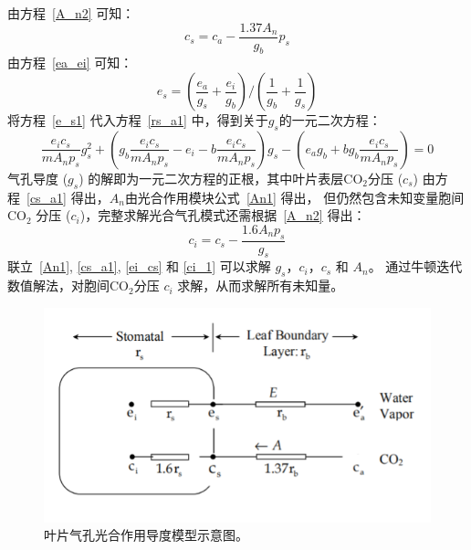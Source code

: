 由方程~\eqref{A_n2} 可知：
\begin{equation}\label{cs_a1}
c_{s}=c_{a}-\frac{1.37 A_{n}}{g_{b}} p_{s}
\end{equation}
由方程~\eqref{ea_ei} 可知：
\begin{equation}\label{e_s1}
e_{s}=\left(\frac{e_{a}}{g_{s}}+\frac{e_{i}}{g_{b}}\right) /\left(\frac{1}{g_{b}}+\frac{1}{g_{s}}\right)
\end{equation}
将方程~\eqref{e_s1} 代入方程~\ref{rs_a1} 中，得到关于$g_s$的一元二次方程：
\begin{equation}\label{ei_cs}
\frac{e_{i} c_{s}}{m A_{n} p_{s}} g_{s}^{2}+\left(g_{b} \frac{e_{i} c_{s}}{m A_{n} p_{s}}-e_{i}-b \frac{e_{i} c_{s}}{m A_{n} p_{s}}\right) g_{s}
-\left(e_{a} g_{b}+b g_{b} \frac{e_{i} c_{s}}{m A_{n} p_{s}}\right)=0
\end{equation}
气孔导度 ($g_s$) 的解即为一元二次方程的正根，其中叶片表层$\mathrm{CO_2}$分压 ($c_s$) 由方程~\eqref{cs_a1} 得出，$A_n$由光合作用模块公式~\eqref{An1} 得出，
但仍然包含未知变量胞间 $\mathrm{CO_2}$ 分压 ($c_i$)，完整求解光合气孔模式还需根据~\eqref{A_n2} 得出：
\begin{equation}\label{ci_1}
c_{i}=c_{s}-\frac{1.6 A_{n} p_{s}}{g_{s}}
\end{equation}
联立~\eqref{An1}, \eqref{cs_a1}, \eqref{ei_cs} 和 \eqref{ci_1} 可以求解 $g_s$，$c_i$，$c_s$ 和 $A_n$。
通过牛顿迭代数值解法，对胞间$\mathrm{CO_2}$分压 $c_i$ 求解，从而求解所有未知量。

{
\begin{figure}[]
\centering
\includegraphics{Figures/气孔导度和光合作用/叶片气孔光合作用导度模型示意图.png}
\caption{叶片气孔光合作用导度模型示意图。}
\label{fig:叶片气孔光合作用导度模型示意图}
\end{figure}
}
